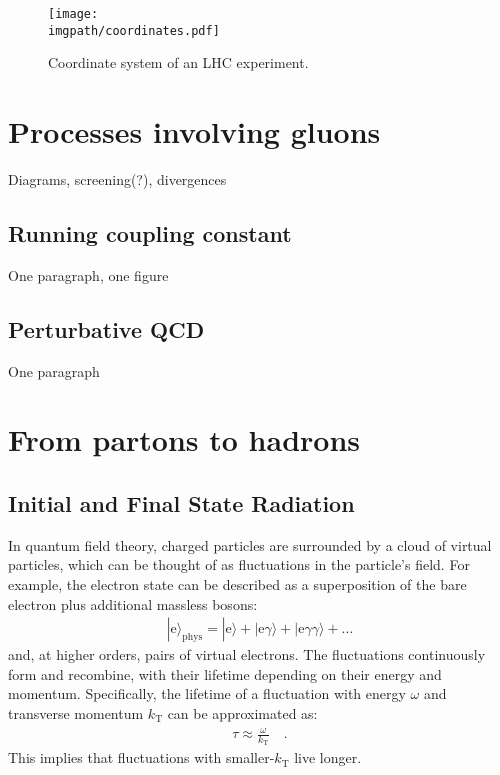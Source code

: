 \begin{figure}[H]
\texttt{[image: \\imgpath/coordinates.pdf]}
\caption{Coordinate system of an LHC experiment.}
\label{fig:intro:coordinates}
\end{figure}

\section{Processes involving gluons}

Diagrams, screening(?), divergences

\subsection{Running coupling constant}

One paragraph, one figure

\subsection{Perturbative QCD}

One paragraph

\section{From partons to hadrons}

\subsection{Initial and Final State Radiation}

In quantum field theory, charged particles are surrounded by a cloud of virtual particles, which can be thought of as fluctuations in the particle's field. For example, the electron state can be described as a superposition of the bare electron plus additional massless bosons:
\begin{align}
|\mathrm{e}\rangle_\mathrm{phys} = |\mathrm{e}\rangle + |\mathrm{e}\gamma\rangle + |\mathrm{e}\gamma\gamma\rangle + \ldots
\end{align}
and, at higher orders, pairs of virtual electrons. The fluctuations continuously form and recombine, with their lifetime depending on their energy and momentum. Specifically, the lifetime of a fluctuation with energy $\omega$ and transverse momentum $k_\mathrm{T}$ can be approximated as:
\begin{align}
\tau \approx \frac{\omega}{k_\mathrm{T}} \quad .
\end{align}
This implies that fluctuations with smaller-$k_\mathrm{T}$ live longer.

